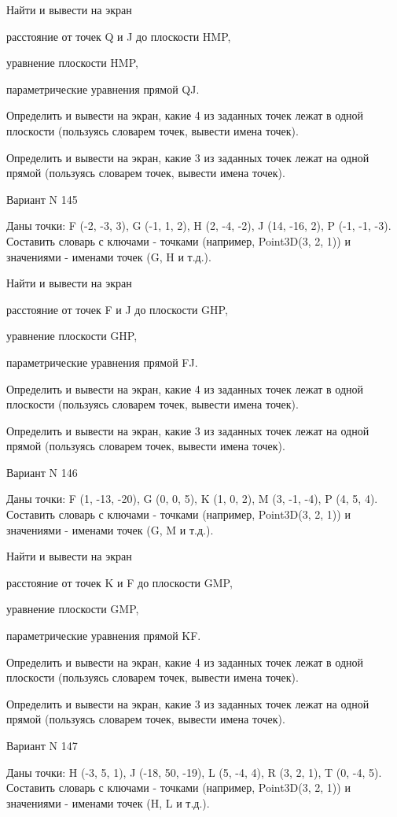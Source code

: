 \documentclass[11pt]{report}
\begin{document}
 
Найти и вывести на экран


расстояние от точек Q и J до плоскости HMP,

 
уравнение плоскости HMP,

 
параметрические уравнения прямой QJ.


Определить и вывести на экран, какие 4 из заданных точек лежат в одной плоскости (пользуясь словарем точек, вывести имена точек).


Определить и вывести на экран, какие 3 из заданных точек лежат на одной прямой (пользуясь словарем точек, вывести имена точек).

Вариант N 145

Даны точки: F (-2, -3, 3), G (-1, 1, 2), H (2, -4, -2), J (14, -16, 2), P (-1, -1, -3).
Составить словарь с ключами - точками (например, Point3D(3, 2, 1)) и значениями - именами точек (G, H и т.д.).

 
Найти и вывести на экран


расстояние от точек F и J до плоскости GHP,

 
уравнение плоскости GHP,

 
параметрические уравнения прямой FJ.


Определить и вывести на экран, какие 4 из заданных точек лежат в одной плоскости (пользуясь словарем точек, вывести имена точек).


Определить и вывести на экран, какие 3 из заданных точек лежат на одной прямой (пользуясь словарем точек, вывести имена точек).

Вариант N 146

Даны точки: F (1, -13, -20), G (0, 0, 5), K (1, 0, 2), M (3, -1, -4), P (4, 5, 4).
Составить словарь с ключами - точками (например, Point3D(3, 2, 1)) и значениями - именами точек (G, M и т.д.).

 
Найти и вывести на экран


расстояние от точек K и F до плоскости GMP,

 
уравнение плоскости GMP,

 
параметрические уравнения прямой KF.


Определить и вывести на экран, какие 4 из заданных точек лежат в одной плоскости (пользуясь словарем точек, вывести имена точек).


Определить и вывести на экран, какие 3 из заданных точек лежат на одной прямой (пользуясь словарем точек, вывести имена точек).

Вариант N 147

Даны точки: H (-3, 5, 1), J (-18, 50, -19), L (5, -4, 4), R (3, 2, 1), T (0, -4, 5).
Составить словарь с ключами - точками (например, Point3D(3, 2, 1)) и значениями - именами точек (H, L и т.д.).
\end{document}
